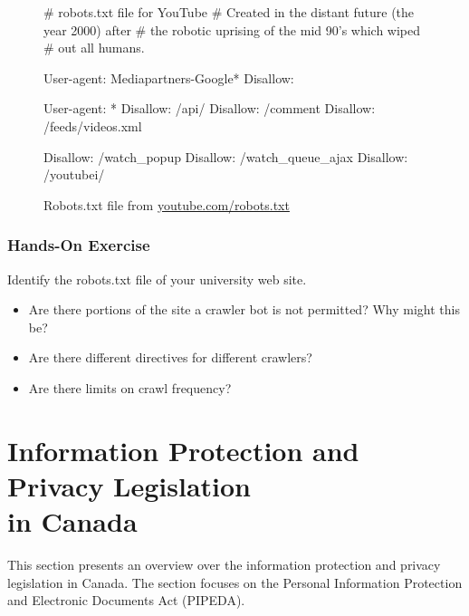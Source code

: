 \begin{figure}
\begin{textcode}
# robots.txt file for YouTube
# Created in the distant future (the year 2000) after
# the robotic uprising of the mid 90's which wiped 
# out all humans.

User-agent: Mediapartners-Google*
Disallow:

User-agent: *
Disallow: /api/
Disallow: /comment
Disallow: /feeds/videos.xml

Disallow: /watch_popup
Disallow: /watch_queue_ajax
Disallow: /youtubei/
\end{textcode}
\caption[Example robots.txt file]{Robots.txt file from \url{youtube.com/robots.txt}}
\label{fig:youtuberobots}
\end{figure}

\begin{tcolorbox}[colback=code]
\subsubsection*{Hands-On Exercise}
Identify the robots.txt file of your university web site.
\begin{itemize}
  \item Are there portions of the site a crawler bot is not permitted? Why might this be?
  \item Are there different directives for different crawlers?
  \item Are there limits on crawl frequency?
\end{itemize}
\end{tcolorbox}

\section{Information Protection and Privacy Legislation\\ in Canada}
\label{sec:privacy}

This section presents an overview over the information protection and privacy legislation in Canada. The section focuses on the Personal Information Protection and Electronic Documents Act (PIPEDA).

